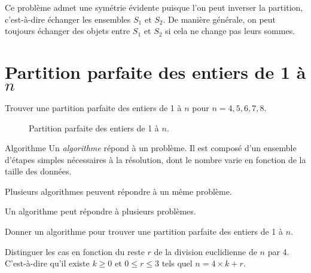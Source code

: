 \documentclass[11pt,a4paper]{article}
\begin{document}
\begin{remarque}{}
    Ce problème admet une symétrie évidente puisque l'on peut inverser la partition, c'est-à-dire échanger les ensembles $S_1$ et $S_2$.
    De manière générale, on peut toujours échanger des objets entre $S_1$ et $S_2$ si cela ne change pas leurs sommes.
 \end{remarque}

\section{Partition parfaite des entiers de 1 à $n$}

\begin{exercice}{}
  Trouver une partition parfaite des entiers de 1 à $n$ pour $n =4, 5, 6, 7, 8$.
  \end{exercice}


  \begin{figure}[htbp]
    \centering
    \resizebox{0.6\linewidth}{!}{
      
    }
    \caption{Partition parfaite des entiers de 1 à $n$.}
  \end{figure}


  \begin{definition}{Algorithme}
    Un \emph{algorithme} répond à un problème. Il est composé d’un ensemble d’étapes simples nécessaires à la résolution, dont le nombre varie en fonction de la taille des données.
  \end{definition}

  \begin{remarque}{}
    Plusieurs algorithmes peuvent répondre à un même problème.
  \end{remarque}

  \begin{remarque}{}
    Un algorithme peut répondre à plusieurs problèmes.
  \end{remarque}

  \begin{exercice}{}
    Donner un algorithme pour trouver une partition parfaite des entiers de 1 à $n$.
  \end{exercice}

  \begin{indice}
    Distinguer les cas en fonction du reste $r$ de la division euclidienne de $n$ par 4. C'est-à-dire qu'il existe $k \geq 0$ et $0 \leq r \leq 3$ tels quel $n = 4 \times k + r$.
  \end{indice}
\end{document}
